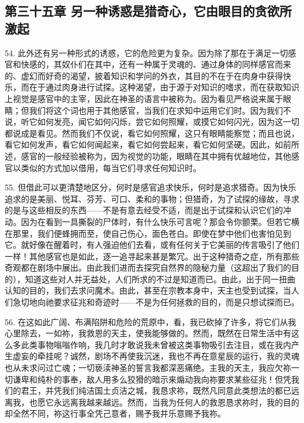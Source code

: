 
\subsection{第三十五章 另一种诱惑是猎奇心，它由眼目的贪欲所激起}

54. 此外还有另一种形式的诱惑，它的危险更为复杂。因为除了那在于满足一切感官和快感的，其奴仆们在其中，还有一种属于灵魂的、通过身体的同样感官而来的、虚幻而好奇的渴望，披着知识和学问的外衣，其目的不在于在肉身中获得快乐，而在于通过肉身进行试探。这种渴望，由于源于对知识的嗜求，而在获取知识上视觉是感官中的主宰，因此在神圣的语言中被称为。因为看见严格说来属于眼睛；但我们将这个词也用于其他感官，当我们在求知中运用它们时。因为我们不说，听它如何发亮，闻它如何闪烁，尝它如何照耀，或摸它如何闪光，因为这一切都说成是看见。然而我们不仅说，看它如何照耀，这只有眼睛能察觉；而且也说，看它如何发声，看它如何闻起来，看它如何尝起来，看它如何坚硬。因此，如前所述，感官的一般经验被称为，因为视觉的功能，眼睛在其中拥有优越地位，其他感官以类似的方式加以借用，每当它们寻求任何知识时。\par

55. 但借此可以更清楚地区分，何时是感官追求快乐，何时是追求猎奇。因为快乐追求的是美丽、悦耳、芬芳、可口、柔和的事物；但猎奇，为了试探的缘故，寻求的是与这些相反的东西——不是有意去经受不适，而是出于试探和认识它们的冲动。因为在看到一具撕裂的尸体时，有什么快乐可言呢？那会令你颤栗。但若它横在那里，我们便蜂拥而至，使自己伤心，面色苍白。即使在梦中他们也害怕见到它。就好像在醒着时，有人强迫他们去看，或有任何关于它美丽的传言吸引了他们一样！其他感官也是如此，逐一追寻起来甚是繁冗。出于这种猎奇之症，所有那些奇观都在剧场中展出。由此我们进而去探究自然界的隐秘力量（这超出了我们的目的），知道这些对人并无益处，人们所求的不过是知道而已。由此，出于同一扭曲认知的目的，我们去求问魔术。由此，甚至在宗教本身中，天主也受到试探，当人们急切地向祂要求征兆和奇迹时——不是为任何拯救的目的，而是只想试探而已。\par

56. 在这如此广阔、布满陷阱和危险的荒原中，看，我已砍掉了许多，将它们从我心里除去，一如祢，我救恩的天主，使我能够做的。然而，既然在日常生活中有这么多此类事物嗡嗡作响，我几时才敢说我未曾被这类事物吸引去注目，或在我内产生虚妄的牵挂呢？诚然，剧场不再使我沉迷，我也不再在意星辰的运行，我的灵魂也从未求问过亡魂；一切亵渎神圣的誓言我都深恶痛绝。主我的天主，我应欠祢一切谦卑和纯朴的事奉，敌人用多么狡猾的暗示来煽动我向祢要求某些征兆！但凭我们的君王，并凭我们纯洁国土贞洁之城，我恳求祢，既然凡同意此类想法的都已远离我，也愿它永远离我越来越远。然而，当我为任何人的救恩恳求祢时，我的目的却全然不同，祢这行事全凭己意者，赐予我并乐意赐予我祢。\par

